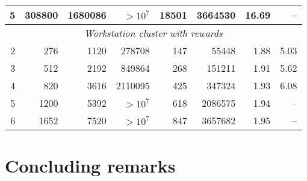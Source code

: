 \documentclass{llncs}
\begin{document}
{\begin{center}
\begin{tabular}{|r|r|r|r|r|r|r|r|}
 5    & 308800    & 1680086     & $> 10^7$    & 18501    & 3664530 & 16.69    & --   \\
\hline \hline
\multicolumn{8}{|c|}{\emph{Workstation cluster with rewards}} \\ 
\hline \hline
 2    & 276       & 1120        & 278708 & 147      & 55448 & 1.88     & 5.03     \\
 3    & 512       & 2192        & 849864 & 268      & 151211 & 1.91     & 5.62     \\
 4    & 820       & 3616        & 2110095 & 425      & 347324  & 1.93     & 6.08     \\
 5    & 1200      & 5392        & $> 10^7$    & 618      & 2086575 & 1.94     & --   \\
 6    & 1652      & 7520        & $> 10^7$    & 847      & 3657682 & 1.95     & --   \\
\hline
\end{tabular}
\end{center}
}

\section{Concluding remarks}
\label{sec:concl}
\end{document}

